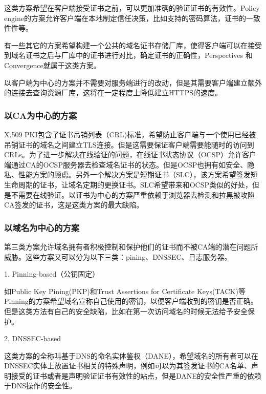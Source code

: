 这类方案希望在客户端接受证书之前，可以更加准确的验证证书的有效性。Policy engine\cite{abadi2013global}的方案允许客户端在本地制定信任决策，比如支持的密码算法，证书的一致性性等。

有一些其它的方案希望构建一个公共的域名证书存储厂库，使得客户端可以在接受到域名证书之后与厂库中的证书进行对比，确定证书的正确性，Perspectives\cite{wendlandt2008perspectives} 和 Convergence\cite{convergence}就属于这类方案。

以客户端为中心的方案并不需要对服务端进行的改动，但是其需要客户端建立额外的连接去查询资源厂库，这将在一定程度上降低建立HTTPS的速度。


\subsubsection{以CA为中心的方案}

X.509 PKI包含了证书吊销列表（CRL)标准\cite{cooper2008internet}，希望防止客户端与一个使用已经被吊销证书的域名之间建立TLS连接。但是这需要保证客户端需要能随时的访问到CRLs。为了进一步解决在线验证的问题，在线证书状态协议（OCSP）\cite{myers1999x}允许客户端通过CA的OCSP服务器去检查域名证书的状态。但是OCSP也拥有如安全、隐私、性能方案的顾虑。另外一个解决方案是短期证书（SLC）\cite{topalovic2012towards}，该方案希望签发短生命周期的证书，让域名定期的更换证书。SLC希望带来和OCSP类似的好处，但是不需要在线验证。以证书为中心的方案严重依赖于浏览器去检测和拉黑被攻陷CA签发的证书，这是这类方案的最大缺陷。


\subsubsection{以域名为中心的方案}


第三类方案允许域名拥有者积极控制和保护他们的证书而不被CA端的潜在问题所威胁。这些方案又可以分为以下三类：pining、DNSSEC、日志服务器。

1. Pinning-based（公钥固定）

如Public Key Pining(PKP)\cite{evans2015public}和Trust Assertions for Certificate Keys(TACK)\cite{topalovic2012towards}等Pinning的方案希望域名宣称自己使用的密钥，以便客户端收到的密钥是否正确。但是这类方法有自己的安全缺陷，比如在第一次访问域名的时候无法给予安全保护。

2. DNSSEC-based

这类方案的全称叫基于DNS的命名实体鉴权（DANE）\cite{schlyter2012dns}，希望域名的所有者可以在DNSSEC实体上放置证书相关的特殊声明，例如可以为其签发证书的CA名单、声明接受的证书或者是声明验证证书有效性的站点，但是DANE的安全性严重的依赖于DNS操作的安全性。


